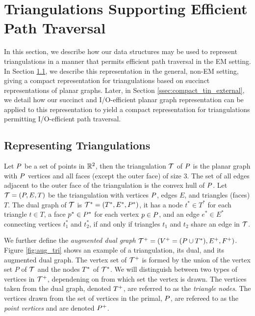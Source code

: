 \section{Triangulations Supporting Efficient Path Traversal}
\label{sec:tins}

In this section, we describe how our data structures may be used to 
represent triangulations in a manner that permits efficient path
traversal in the EM setting.
In Section \ref{ssec:triangulation_rep}, we describe this representation in the 
general, non-EM setting, giving a compact representation for triangulations 
based on succinct representations of planar graphs.
Later, in Section \ref{ssec:compact_tin_external}, we detail how our succinct
and I/O-efficient planar graph representation can be applied to this representation
to yield a compact representation for 
triangulations permitting I/O-efficient path traversal.

\subsection{Representing Triangulations}
\label{ssec:triangulation_rep}

Let $P$ be a set of points in $\mathbb{R}^2$, then the triangulation $\mathcal{T}$
of $P$ is the planar graph with $P$ vertices and all faces 
(except the outer face) of size $3$.
The set of all edges adjacent to the outer face of the triangulation is the
convex hull of $P$. 
Let $\mathcal{T} = (P,E,T)$ be the triangulation with vertices $P$, 
edges $E$, and 
triangles (faces) $T$. 
The dual graph of $\mathcal{T}$ is $\mathcal{T}^* = (T^*,E^*,P^*)$, it has a node
 $t^* \in T^*$ for each triangle $t \in T$, a face $p^* \in P^*$ for each 
vertex $p \in P$, and an edge $e^* \in E^*$ connecting vertices $t^*_1$ and
 $t^*_2$, if and only if triangles $t_1$ and $t_2$ share an edge in $\mathcal{T}$.

We further define the \emph{augmented dual graph} 
 $\mathcal{T}^+ = (V^+ = (P \cup T^*), E^+,
F^+)$.
Figure \ref{fig:aug_tri} shows an example of a triangulation, its dual, 
and its augmented dual graph.
The vertex set of $\mathcal{T}^+$ is formed by the union of the vertex set 
$P$ of $\mathcal{T}$ and the nodes $T^*$ of $\mathcal{T}^*$. 
We will distinguish between two types of vertices in $\mathcal{T}^+$, 
dependening on from which set the vertex is drawn. 
The vertices taken from the dual graph, denoted $T^+$, 
are referred to as the \emph{triangle nodes}. 
The vertices drawn from the set of vertices in the primal, $P$, 
are refereed   
to as the \emph{point vertices} and are denoted $P^+$.

